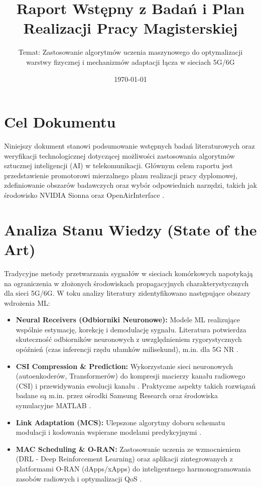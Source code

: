 \documentclass[12pt, a4paper]{article}
\title{\vspace{-2cm}\textbf{Raport Wstępny z Badań i Plan Realizacji Pracy Magisterskiej}}
\author{Temat: Zastosowanie algorytmów uczenia maszynowego do optymalizacji\\ warstwy fizycznej i mechanizmów adaptacji łącza w sieciach 5G/6G}
\date{\today}
\begin{document}
\maketitle

\section{Cel Dokumentu}
Niniejszy dokument stanowi podsumowanie wstępnych badań literaturowych oraz weryfikacji technologicznej dotyczącej możliwości zastosowania algorytmów sztucznej inteligencji (AI) w telekomunikacji. Głównym celem raportu jest przedstawienie promotorowi mierzalnego planu realizacji pracy dyplomowej, zdefiniowanie obszarów badawczych oraz wybór odpowiednich narzędzi, takich jak środowisko NVIDIA Sionna \cite{sionna-phy, sionna-sys, sionna-rt, sionna-rk} oraz OpenAirInterface \cite{oai}.

\section{Analiza Stanu Wiedzy (State of the Art)}
Tradycyjne metody przetwarzania sygnałów w sieciach komórkowych napotykają na ograniczenia w złożonych środowiskach propagacyjnych charakterystycznych dla sieci 5G/6G. W toku analizy literatury zidentyfikowano następujące obszary wdrożenia ML:

\begin{itemize}
    \item \textbf{Neural Receivers (Odbiorniki Neuronowe):} Modele ML realizujące wspólnie estymację, korekcję i demodulację sygnału. Literatura potwierdza skuteczność odbiorników neuronowych z uwzględnieniem rygorystycznych opóźnień (czas inferencji rzędu ułamków milisekund), m.in. dla 5G NR \cite{arxiv-2409-02912}.
    \item \textbf{CSI Compression \& Prediction:} Wykorzystanie sieci neuronowych (autoenkoderów, Transformerów) do kompresji macierzy kanału radiowego (CSI) \cite{arxiv-2206-14383, ieee-9417115} i przewidywania ewolucji kanału \cite{arxiv-2409-13494}. Praktyczne aspekty takich rozwiązań badane są m.in. przez ośrodki Samsung Research \cite{samsung-csi} oraz środowiska symulacyjne MATLAB \cite{mathworks-csi}.
    \item \textbf{Link Adaptation (MCS):} Ulepszone algorytmy doboru schematu modulacji i kodowania wspierane modelami predykcyjnymi \cite{arxiv-2603-00689, acm-mcs}.
    \item \textbf{MAC Scheduling \& O-RAN:} Zastosowanie uczenia ze wzmocnieniem (DRL - Deep Reinforcement Learning) oraz aplikacji zintegrowanych z platformami O-RAN (dApps/xApps) do inteligentnego harmonogramowania zasobów radiowych i optymalizacji QoS \cite{rg-lte-drl, rg-oran-mac, rg-leasch, rg-actor-critic, rg-dapps, arxiv-2509-07242}.
\end{itemize}
\end{document}
